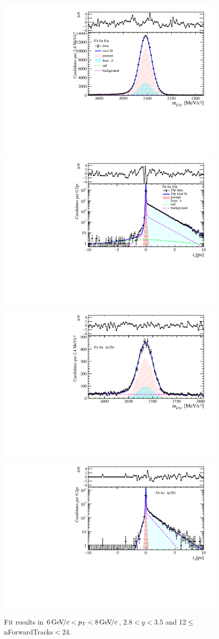 \begin{figure}[H]
\begin{center}
\includegraphics[width=0.47\linewidth]{pdf/Jpsi/drawmassF/n2y2pt4.pdf}
\includegraphics[width=0.47\linewidth]{pdf/Jpsi/2DFitF/n2y2pt4.pdf}
\vspace*{-0.5cm}
\includegraphics[width=0.47\linewidth]{pdf/Psi2S/drawmassF/n2y2pt4.pdf}
\includegraphics[width=0.47\linewidth]{pdf/Psi2S/2DFitF/n2y2pt4.pdf}
\vspace*{-0.5cm}
\end{center}
\caption{Fit results in $6\text{\,Ge\kern -0.1em V\!/}c<p_{\mathrm{T}}<8\text{\,Ge\kern -0.1em V\!/}c$, $2.8<y<3.5$ and 12$\leq$nForwardTracks$<$24.}
\label{Fitn2y2pt4}
\end{figure}
